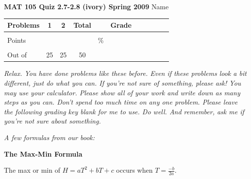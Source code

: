 \documentclass[12pt]{article}
\begin{document}
{\bf MAT 105 Quiz 2.7-2.8 (ivory) Spring 2009} \hspace{.4in} {\large Name} \hrulefill

\hrulefill


\begin{center}

\begin{tabular}
{|l|c|c|c|c|c|c|c|c|c|c|} \hline

 Problems & \hspace{5 pt} 1 \hspace{5 pt}  & \hspace{5 pt} 2 \hspace{5 pt} &  \hspace{5 pt} Total  \hspace{5 pt} & &  \hspace{5 pt} Grade \hspace{5 pt}  \\ \hline
&&& &&\\  
Points &&& &    \hspace{.8in}\% &  \\ 
&&& && \\  \hline
Out of & 25 & 25  &50 & & \\ \hline

\end {tabular}
 
\end{center}

 \emph{Relax.  You have done problems like these before.  Even if these problems look a bit different, just do what you can.  If you're not sure of something, please ask! You may use your calculator.  Please show all of your work and write down as many steps as you can.  Don't spend too much time on any one problem.  Please leave the following grading key blank for me to use.  Do well.  And remember, ask me if you're not sure about something.}
 
 \vspace{.1in}
 
 \emph{A few formulas from our book:}
  \vspace{.2in}
 
  \begin{center}
\textbf{The Max-Min Formula}
\vspace{.1in}

The max or min of $H=aT^2+bT+c$ occurs when $\displaystyle T=\frac{-b}{2a}$.

 \end{center}
 
\end{document}
